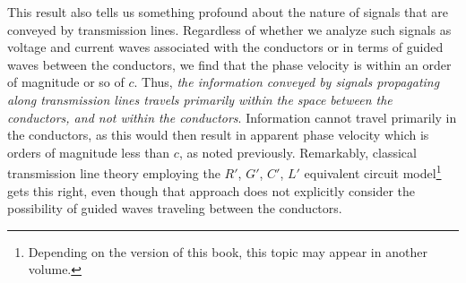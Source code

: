 This result also tells us something profound about the nature of signals that are conveyed by transmission lines.  Regardless of whether we analyze such signals as voltage and current waves associated with the conductors or in terms of guided waves between the conductors, we find that the phase velocity is within an order of magnitude or so of $c$.  Thus, \emph{the information conveyed by signals propagating along transmission lines travels primarily within the space between the conductors, and not within the conductors}.  Information cannot travel primarily in the conductors, as this would then result in apparent phase velocity which is orders of magnitude less than $c$, as noted previously.  Remarkably, classical transmission line theory employing the $R'$, $G'$, $C'$, $L'$ equivalent circuit model\footnote{Depending on the version of this book, this topic may appear in another volume.} gets this right, even though that approach does not explicitly consider the possibility of guided waves traveling between the conductors.      





